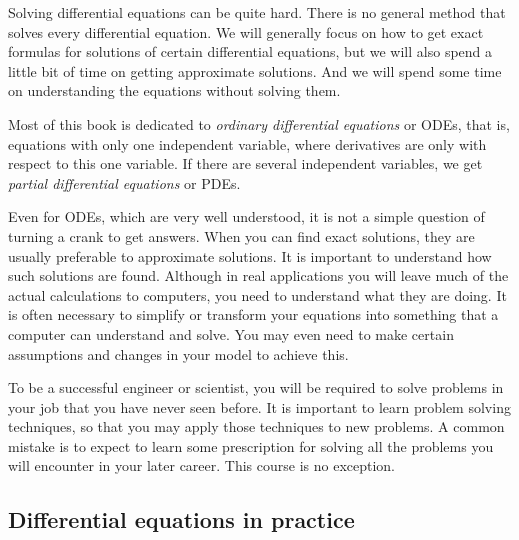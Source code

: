 \medskip

Solving differential equations can be quite hard.  
There is no general method that solves every differential equation.  We will
generally focus on how to get exact formulas for solutions of certain
differential
equations, but we will also spend a little bit of time
on getting approximate solutions.
And we will spend some time on understanding the equations without solving
them.

Most of this book is dedicated to
\emph{ordinary differential equations}
or ODEs, that is, equations with
only one independent variable, where derivatives are only with respect to
this one variable.
If there are several independent variables, we get
\emph{partial differential equations}
or PDEs.

Even for ODEs, which are very well understood, it is not a simple question
of turning a crank to get answers.  
When you can find exact solutions, they are usually preferable to 
approximate solutions.  It is important to understand how
such solutions are found.
Although in real applications you will
leave much of the actual calculations to computers, you
need to understand what they are doing.  It is often necessary
to simplify or transform your equations into something that a computer can
understand and solve.
You may even need to make certain assumptions and changes in your
model to achieve this.

To be a successful engineer or scientist, you will be required to solve
problems in your job that you have never seen before.  It is important to
learn problem solving techniques, so that you may apply those techniques to
new problems.  A common mistake is to expect to learn some prescription for
solving all the problems you will encounter in your later career.  This
course is no exception.

\newpage

\subsection{Differential equations in practice}

\begin{mywrapfigsimp}{3.05in}{3.35in}
\noindent
{}
\diffypdfversion{\par\vspace*{5pt}}
\end{mywrapfigsimp}

